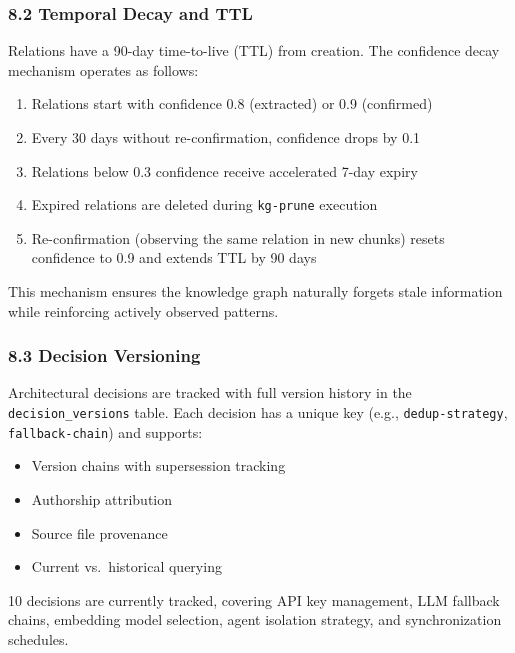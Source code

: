 \documentclass[
]{article}
\providecommand{\tightlist}{%
  \setlength{\itemsep}{0pt}\setlength{\parskip}{0pt}}
\begin{document}
\subsubsection{8.2 Temporal Decay and TTL}\label{temporal-decay-and-ttl}

Relations have a 90-day time-to-live (TTL) from creation. The confidence
decay mechanism operates as follows:

\begin{enumerate}
\def\labelenumi{\arabic{enumi}.}
\tightlist
\item
  Relations start with confidence 0.8 (extracted) or 0.9 (confirmed)
\item
  Every 30 days without re-confirmation, confidence drops by 0.1
\item
  Relations below 0.3 confidence receive accelerated 7-day expiry
\item
  Expired relations are deleted during \texttt{kg-prune} execution
\item
  Re-confirmation (observing the same relation in new chunks) resets
  confidence to 0.9 and extends TTL by 90 days
\end{enumerate}

This mechanism ensures the knowledge graph naturally forgets stale
information while reinforcing actively observed patterns.

\subsubsection{8.3 Decision Versioning}\label{decision-versioning}

Architectural decisions are tracked with full version history in the
\texttt{decision\_versions} table. Each decision has a unique key (e.g.,
\texttt{dedup-strategy}, \texttt{fallback-chain}) and supports:

\begin{itemize}
\tightlist
\item
  Version chains with supersession tracking
\item
  Authorship attribution
\item
  Source file provenance
\item
  Current vs.~historical querying
\end{itemize}

10 decisions are currently tracked, covering API key management, LLM
fallback chains, embedding model selection, agent isolation strategy,
and synchronization schedules.
\end{document}
